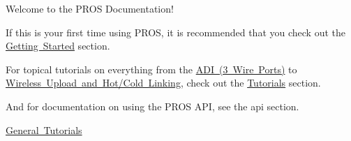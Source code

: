 Welcome to the P\+R\+OS Documentation!

If this is your first time using P\+R\+OS, it is recommended that you check out the \mbox{\hyperlink{getting-started}{Getting Started}} section.

For topical tutorials on everything from the \mbox{\hyperlink{adi_8md}{A\+DI (3 Wire Ports)}} to \mbox{\hyperlink{wireless-upload_8md}{Wireless Upload and Hot/\+Cold Linking}}, check out the \mbox{\hyperlink{tutorials}{Tutorials}} section.

And for documentation on using the P\+R\+OS A\+PI, see the api section.

\mbox{\hyperlink{general-tutorials}{General Tutorials}} 